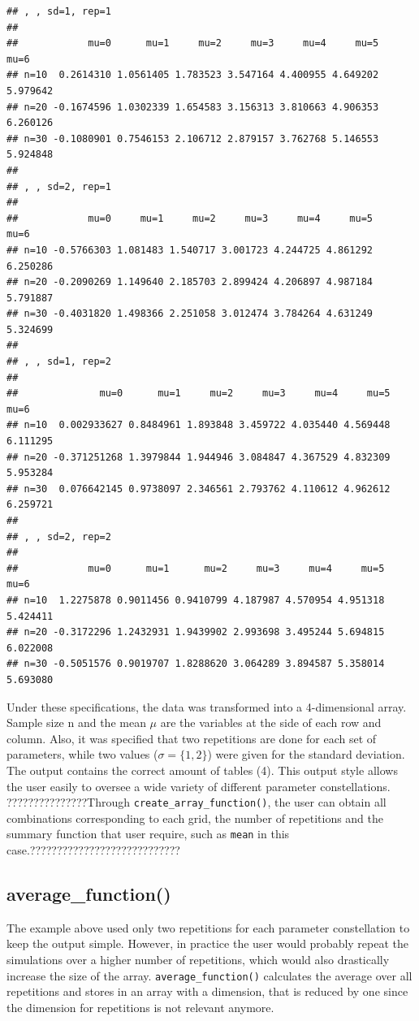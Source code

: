 \documentclass[11pt,a4paper]{article}
\begin{document}
\begin{verbatim}
## , , sd=1, rep=1
## 
##            mu=0      mu=1     mu=2     mu=3     mu=4     mu=5     mu=6
## n=10  0.2614310 1.0561405 1.783523 3.547164 4.400955 4.649202 5.979642
## n=20 -0.1674596 1.0302339 1.654583 3.156313 3.810663 4.906353 6.260126
## n=30 -0.1080901 0.7546153 2.106712 2.879157 3.762768 5.146553 5.924848
## 
## , , sd=2, rep=1
## 
##            mu=0     mu=1     mu=2     mu=3     mu=4     mu=5     mu=6
## n=10 -0.5766303 1.081483 1.540717 3.001723 4.244725 4.861292 6.250286
## n=20 -0.2090269 1.149640 2.185703 2.899424 4.206897 4.987184 5.791887
## n=30 -0.4031820 1.498366 2.251058 3.012474 3.784264 4.631249 5.324699
## 
## , , sd=1, rep=2
## 
##              mu=0      mu=1     mu=2     mu=3     mu=4     mu=5     mu=6
## n=10  0.002933627 0.8484961 1.893848 3.459722 4.035440 4.569448 6.111295
## n=20 -0.371251268 1.3979844 1.944946 3.084847 4.367529 4.832309 5.953284
## n=30  0.076642145 0.9738097 2.346561 2.793762 4.110612 4.962612 6.259721
## 
## , , sd=2, rep=2
## 
##            mu=0      mu=1      mu=2     mu=3     mu=4     mu=5     mu=6
## n=10  1.2275878 0.9011456 0.9410799 4.187987 4.570954 4.951318 5.424411
## n=20 -0.3172296 1.2432931 1.9439902 2.993698 3.495244 5.694815 6.022008
## n=30 -0.5051576 0.9019707 1.8288620 3.064289 3.894587 5.358014 5.693080
\end{verbatim}

Under these specifications, the data was transformed into a
4-dimensional array. Sample size n and the mean \(\mu\) are the
variables at the side of each row and column. Also, it was specified
that two repetitions are done for each set of parameters, while two
values (\(\sigma = \{1, 2\}\)) were given for the standard deviation.
The output contains the correct amount of tables (4). This output style
allows the user easily to oversee a wide variety of different parameter
constellations. ???????????????Through
\texttt{create\_array\_function()}, the user can obtain all combinations
corresponding to each grid, the number of repetitions and the summary
function that user require, such as \texttt{mean} in this
case.????????????????????????????

\hypertarget{average_function}{%
\subsection{average\_function()}\label{average_function}}

The example above used only two repetitions for each parameter
constellation to keep the output simple. However, in practice the user
would probably repeat the simulations over a higher number of
repetitions, which would also drastically increase the size of the
array. \texttt{average\_function()} calculates the average over all
repetitions and stores in an array with a dimension, that is reduced by
one since the dimension for repetitions is not relevant anymore.
\end{document}
